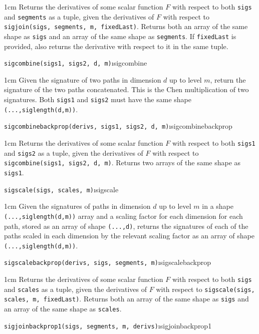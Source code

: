 \documentclass[a4paper]{extarticle}
\newenvironment{defn}{\begin{adjustwidth}{1cm}{}\ignorespaces}{\end{adjustwidth}\ignorespacesafterend}
\begin{document}
\begin{defn}
\nopagebreak Returns the derivatives of some scalar function $F$ with respect to both \verb|sigs| and \verb|segments| as a tuple, given %
the derivatives of $F$ with respect to \verb!sigjoin(sigs, segments, m, fixedLast)!. Returns both an array of the same shape as \verb|sigs| and an array of the same shape as \verb|segments|. If \verb|fixedLast| is provided, also returns the derivative with respect to it in the same tuple.
\end{defn}
\verb!sigcombine(sigs1, sigs2, d, m)!\i{sigcombine}

\begin{defn}
\nopagebreak Given the signature of two paths in dimension $d$ up to level $m$, return the signature of the two paths concatenated. This is the Chen multiplication of two signatures. Both \verb|sigs1| and \verb|sigs2| must have the same shape \verb|(...,siglength(d,m))|.
\end{defn}
\verb!sigcombinebackprop(derivs, sigs1, sigs2, d, m)!\i{sigcombinebackprop}

\begin{defn}
\nopagebreak Returns the derivatives of some scalar function $F$ with respect to both \verb|sigs1| and \verb|sigs2| as a tuple, given %
the derivatives of $F$ with respect to \verb!sigcombine(sigs1, sigs2, d, m)!. Returns two arrays of the same shape as \verb|sigs1|.
\end{defn}
\verb!sigscale(sigs, scales, m)!\i{sigscale}
\begin{defn}
	\nopagebreak Given the signatures of paths in dimension $d$ up to level $m$ in a shape \verb|(...,siglength(d,m))| array and a scaling factor for each dimension for each path, stored as an array of shape \verb|(...,d)|, returns the signatures of each of the paths scaled in each dimension by the relevant scaling factor as an array of shape \verb|(...,siglength(d,m))|. 
\end{defn}
\verb!sigscalebackprop(derivs, sigs, segments, m)!\i{sigscalebackprop}

\begin{defn}
	\nopagebreak Returns the derivatives of some scalar function $F$ with respect to both \verb|sigs| and \verb|scales| as a tuple, given %
	the derivatives of $F$ with respect to \verb!sigscale(sigs, scales, m, fixedLast)!. Returns both an array of the same shape as \verb|sigs| and an array of the same shape as \verb|scales|. 
\end{defn}
\iffalse
\verb!sigjoinbackprop1(sigs, segments, m, derivs)!\i{sigjoinbackprop1}
\end{document}

